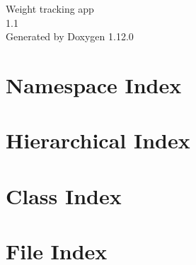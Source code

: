 \documentclass[twoside]{book}
\newcommand{\+}{\discretionary{\mbox{\scriptsize$\hookleftarrow$}}{}{}}
\newcommand{\clearemptydoublepage}{%
    \newpage{\pagestyle{empty}\cleardoublepage}%
  }
\begin{document}
  \raggedbottom
    \hypersetup{pageanchor=false,
                bookmarksnumbered=true,
                pdfencoding=unicode
               }
  \begin{titlepage}
  \vspace*{7cm}
  \begin{center}%
  {\Large Weight tracking app}\\
  [1ex]\large 1.\+1 \\
  \vspace*{1cm}
  {\large Generated by Doxygen 1.12.0}\\
  \end{center}
  \end{titlepage}
  \clearemptydoublepage
  \tableofcontents
  \clearemptydoublepage
  \hypersetup{pageanchor=true}
\chapter{Namespace Index}

\chapter{Hierarchical Index}

\chapter{Class Index}

\chapter{File Index}

\end{document}
